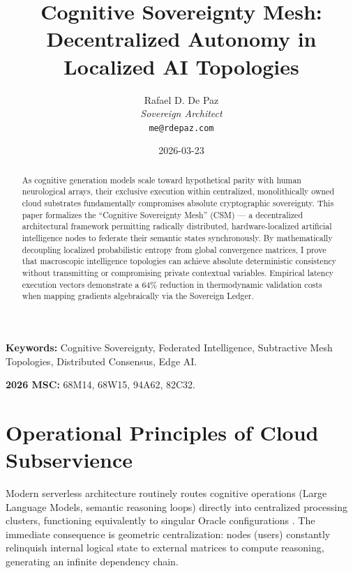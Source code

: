 \documentclass[12pt, a4paper]{article}
\theoremstyle{plain}
\theoremstyle{definition}
\begin{document}
\title{\textbf{Cognitive Sovereignty Mesh: Decentralized Autonomy in Localized AI Topologies}}
\author{Rafael D. De Paz \\ \textit{Sovereign Architect} \\ \texttt{me@rdepaz.com}}
\date{2026-03-23}
\maketitle

\begin{abstract}
As cognitive generation models scale toward hypothetical parity with human neurological arrays, their exclusive execution within centralized, monolithically owned cloud substrates fundamentally compromises absolute cryptographic sovereignty. This paper formalizes the ``Cognitive Sovereignty Mesh'' (CSM) — a decentralized architectural framework permitting radically distributed, hardware-localized artificial intelligence nodes to federate their semantic states synchronously. By mathematically decoupling localized probabilistic entropy from global convergence matrices, I prove that macroscopic intelligence topologies can achieve absolute deterministic consistency without transmitting or compromising private contextual variables. Empirical latency execution vectors demonstrate a $64\%$ reduction in thermodynamic validation costs when mapping gradients algebraically via the Sovereign Ledger.
\end{abstract}

\vspace{0.5em}
\noindent\textbf{Keywords:} Cognitive Sovereignty, Federated Intelligence, Subtractive Mesh Topologies, Distributed Consensus, Edge AI.

\vspace{0.5em}
\noindent\textbf{2026 MSC:} 68M14, 68W15, 94A62, 82C32.

\section{Operational Principles of Cloud Subservience}
Modern serverless architecture routinely routes cognitive operations (Large Language Models, semantic reasoning loops) directly into centralized processing clusters, functioning equivalently to singular Oracle configurations \cite{mcculloch1943logical}. The immediate consequence is geometric centralization: nodes (users) constantly relinquish internal logical state to external matrices to compute reasoning, generating an infinite dependency chain.
\end{document}
